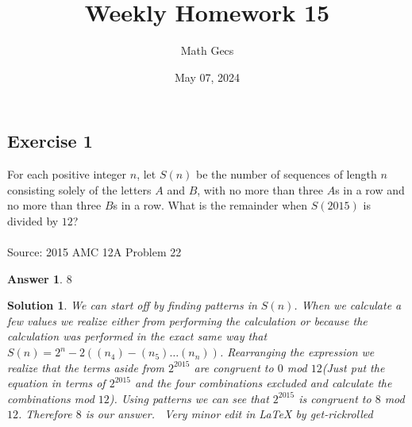 \documentclass[12pt]{article}
\title{Weekly Homework 15}
\author{Math Gecs}
\date{May 07, 2024}
\newtheorem*{answer*}{Answer}
\newtheorem*{solution*}{Solution}
\begin{document}
\maketitle

\subsection*{Exercise 1}
For each positive integer $n$, let $S(n)$ be the number of sequences of length $n$ consisting solely of the letters $A$ and $B$, with no more than three $A$s in a row and no more than three $B$s in a row. What is the remainder when $S(2015)$ is divided by $12$?
\\ \\
Source: 2015 AMC 12A Problem 22

\begin{answer*}
$\boxed {8}$
\end{answer*}

\begin{solution*}
We can start off by finding patterns in $S(n)$. When we calculate a few values we realize either from performing the calculation or because the calculation was performed in the exact same way that $S(n) = 2^n - 2((n_4)- (n_5) \dots (n_n))$. Rearranging the expression we realize that the terms aside from $2^{2015}$ are congruent to $0$ mod $12$(Just put the equation in terms of $2^{2015}$ and the four combinations excluded and calculate the combinations mod $12$). Using patterns we can see that $2^{2015}$ is congruent to $8$ mod $12$. Therefore $\boxed {8}$ is our answer. ~Very minor edit in LaTeX by get-rickrolled
\end{solution*}
\end{document}
